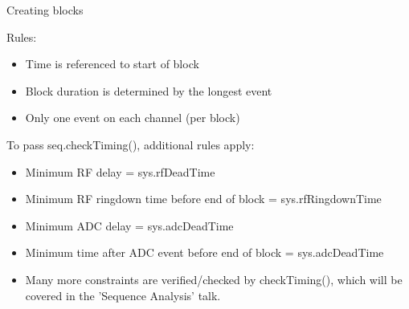 \documentclass{beamer}
\begin{document}
\begin{frame}{Creating blocks}

Rules:
\begin{itemize}
    \item Time is referenced to start of block
    \item Block duration is determined by the longest event
    \item Only one event on each channel (per block)
\end{itemize}

\medskip
To pass seq.checkTiming(), additional rules apply:
\begin{itemize}
    \item Minimum RF delay = sys.rfDeadTime
    \item Minimum RF ringdown time before end of block = sys.rfRingdownTime
    \item Minimum ADC delay = sys.adcDeadTime
    \item Minimum time after ADC event before end of block = sys.adcDeadTime
    \item Many more constraints are verified/checked by checkTiming(),
          which will be covered in the 'Sequence Analysis' talk.
\end{itemize}

\end{frame}
\end{document}
